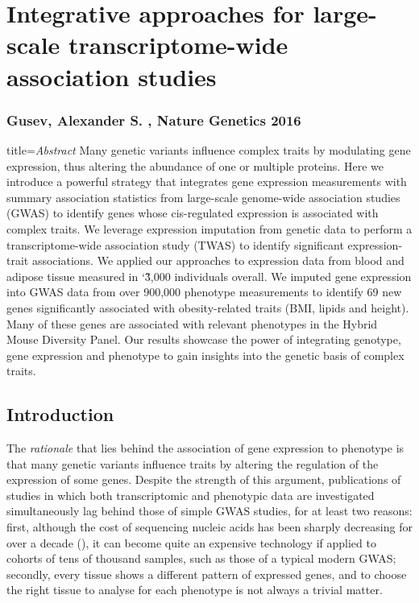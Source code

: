 \documentclass[../main.tex]{subfiles}
\begin{document}
\chapter{Integrative approaches for large-scale transcriptome-wide 
association studies}

\subsection{Gusev, Alexander S. \etal, Nature Genetics 2016}

\begin{external_abstract}{title=\textit{Abstract}}
Many genetic variants influence complex traits by modulating gene 
expression, thus altering the abundance of one or multiple proteins. 
Here we introduce a powerful strategy that integrates gene expression 
measurements with summary association statistics from large-scale 
genome-wide association studies (GWAS) to identify genes whose 
cis-regulated expression is associated with complex traits. We leverage 
expression imputation from genetic data to perform a transcriptome-wide 
association study (TWAS) to identify significant expression-trait 
associations. We applied our approaches to expression data from blood 
and adipose tissue measured in \char`\~3,000 individuals overall. We 
imputed gene expression into GWAS data from over 900,000 phenotype 
measurements to identify 69 new genes significantly associated with 
obesity-related traits (BMI, lipids and height). Many of these genes are 
associated with relevant phenotypes in the Hybrid Mouse Diversity Panel. 
Our results showcase the power of integrating genotype, gene expression 
and phenotype to gain insights into the genetic basis of complex traits.
\end{external_abstract}

\section{Introduction}

The \textit{rationale} that lies behind the association of gene 
expression to phenotype is that many genetic variants influence traits 
by altering the regulation of the expression of some genes. Despite the 
strength of this argument, publications of studies in which both 
transcriptomic and phenotypic data are investigated simultaneously lag 
behind those of simple GWAS studies, for at least two reasons: first, 
although the cost of sequencing nucleic acids has been sharply 
decreasing for over a decade (), it can become 
quite an expensive technology if applied to cohorts of tens of thousand 
samples, such as those of a typical modern GWAS; secondly, every tissue 
shows a different pattern of expressed genes, and to choose the right 
tissue to analyse for each phenotype is not always a trivial 
matter.
\end{document}
